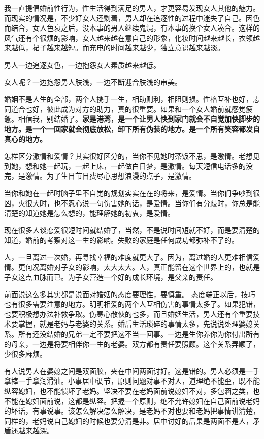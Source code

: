 \documentclass[punct=kaiming, zihao=5, openany, fontset=sikou]{ctexbook}
\begin{document}
我一直提倡婚前性行为，性生活得到满足的男人，才更容易发现女人其他的魅力。而现实的情况是，不少好女人还剩着，男人却在追逐性的过程中迷失了自己。因色而结合，女人色衰之后，没本事的男人继续鬼混，有本事的换个女人凑合。这样的风气还有个很烦的影响，女人越来越在意自己的形象，化妆时间越来越长，衣领越来越低，裙子越来越短。而充电的时间越来越少，独立意识越来越淡。

男人一边追逐女色，一边抱怨女人素质越来越低。

女人呢？一边抱怨男人肤浅，一边不断迎合肤浅的审美。

婚姻不是人生的全部，两个人携手一生，相助则利，相阻则损。性格互补也好，志同道合也好，彼此成为对方的助力，真的很重要。如果和一个女人婚前就感觉疲惫。相信我，别结婚了。\textbf{家是港湾，是一个让男人快到家门就会不自觉加快脚步的地方。是一个一回家就会彻底放松，卸下所有伪装的地方。是一个所有笑容都发自真心的地方。}

怎样区分激情和爱情？其实很好区分的，当你不见她时茶饭不思，是激情。老想见到她，想和她一起玩，一起上床，一起做白日梦，是激情。每天短信电话多的没完，是激情。为了生日节日费尽心思想浪漫的点子，是激情。

当你和她在一起时脑子里不自觉的规划实实在在的将来，是爱情。当你们争吵到很凶，火很大时，也不忍心说一句伤害她的话，是爱情。当你们有分歧时，你总是能清楚的知道她是怎么想的，能理解她的初衷，是爱情。

现在很多人谈恋爱很短时间就结婚了，当然，不是说时间短就不好，而是要清楚的知道，婚前的考察对这一生的影响。失败的家庭是任何成功都弥补不了的。

人，一旦离过一次婚，再寻找幸福的难度就更大了。因为，离过婚的人更难相信爱情。更何况离婚对子女的影响，太大太大。人，真正能留在这个世界上的，也就是子女这点血脉而已。为子女营造一个好的成长环境，是父亲的责任。 

前面说这么多其实都是说面对婚姻的态度要理性，要慎重。  态度端正以后，技巧也有很多需要注意的地方。明明相爱的两个人互相伤害的事情太多了。如果犯错，也要积极想办法补救争取。伤寒心散伙的也多，而且婚姻生活，男人还有个重要技术要掌握，就是老妈与老婆的关系。婚后生活琐碎的事情太多，先说说处理婆媳关系。所有还没结婚的兄弟一定不要把这不当一回事。一边是生你养你为你付出所有的母亲，一边是将要相伴你一生的老婆。双方都有责任要照顾。这个关系弄顺了，少很多麻烦。 

有人说男人在婆媳之间是双面胶，夹在中间两面讨好。这是错的。男人必须是一手拿棒一手拿润滑油。小事居中调节，原则问题对事不对人，道理绝不能歪，既不能纵容媳妇，也不能惯坏了老妈。坚决不要在老妈面前说媳妇不对，多包涵之类，也不能在媳妇面前说，这都是纵容。把握一个原则，绝不允许媳妇在自己面前说老妈的坏话，有事说事。该怎么解决怎么解决，是老妈不对也要和老妈把事情讲清楚，同样的，老妈说自己媳妇的时候也要分清是非。居中讨好的后果是两面不是人，矛盾还越来越深。 
\end{document}
